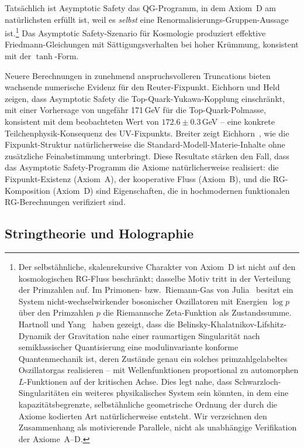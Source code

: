 \documentclass[aps,prd,twocolumn,superscriptaddress,nofootinbib]{revtex4-2}
\begin{document}
Tatsächlich ist Asymptotic Safety das QG-Programm, in dem Axiom~D am natürlichsten erfüllt ist, weil es \textit{selbst} eine Renormalisierungs-Gruppen-Aussage ist.\footnote{Der selbstähnliche, skalenrekursive Charakter von Axiom~D ist nicht
auf den kosmologischen RG-Fluss beschränkt; dasselbe Motiv tritt in der
Verteilung der Primzahlen auf. Im Primonen- bzw.\ Riemann-Gas von
Julia~\cite{Julia1990} besitzt ein System nicht-wechselwirkender bosonischer
Oszillatoren mit Energien $\log p$ über den Primzahlen $p$ die Riemannsche
Zeta-Funktion als Zustandssumme. Hartnoll und Yang~\cite{HartnollYang2025}
haben gezeigt, dass die Belinsky-Khalatnikov-Lifshitz-Dynamik der Gravitation
nahe einer raumartigen Singularität nach semiklassischer Quantisierung eine
modulinvariante konforme Quantenmechanik ist, deren Zustände genau ein solches
primzahlgelabeltes Oszillatorgas realisieren -- mit Wellenfunktionen
proportional zu automorphen $L$-Funktionen auf der kritischen Achse. Dies legt
nahe, dass Schwarzloch-Singularitäten ein weiteres physikalisches System sein
könnten, in dem eine kapazitätsbegrenzte, selbstähnliche geometrische Ordnung
der durch die Axiome kodierten Art natürlicherweise entsteht. Wir verzeichnen
den Zusammenhang als motivierende Parallele, nicht als unabhängige Verifikation
der Axiome~A--D.} Das Asymptotic Safety-Szenario für Kosmologie \cite{Bonanno2002} produziert effektive Friedmann-Gleichungen mit Sättigungsverhalten bei hoher Krümmung, konsistent mit der $\tanh$-Form.

Neuere Berechnungen in zunehmend anspruchsvolleren Truncations bieten wachsende numerische Evidenz für den Reuter-Fixpunkt. Eichhorn und Held~\cite{EichhornHeld2018} zeigen, dass Asymptotic Safety die Top-Quark-Yukawa-Kopplung einschränkt, mit einer Vorhersage von ungefähr 171\,GeV für die Top-Quark-Polmasse, konsistent mit dem beobachteten Wert von $172.6 \pm 0.3$\,GeV \cite{PDG2024} -- eine konkrete Teilchenphysik-Konsequenz des UV-Fixpunkts. Breiter zeigt Eichhorn~\cite{Eichhorn2020}, wie die Fixpunkt-Struktur natürlicherweise die Standard-Modell-Materie-Inhalte ohne zusätzliche Feinabstimmung unterbringt. Diese Resultate stärken den Fall, dass das Asymptotic Safety-Programm die Axiome natürlicherweise realisiert: die Fixpunkt-Existenz (Axiom~A), der kooperative Fluss (Axiom~B), und die RG-Komposition (Axiom~D) sind Eigenschaften, die in hochmodernen funktionalen RG-Berechnungen verifiziert sind.

\subsection{Stringtheorie und Holographie}
\end{document}
